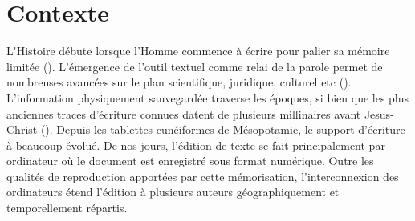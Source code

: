 
\section{Contexte}




\lettrine{L}'Histoire débute lorsque l'Homme commence à écrire pour palier sa
mémoire limitée (\REF). L'émergence de l'outil textuel comme relai de la parole
permet de nombreuses avancées sur le plan scientifique, juridique, culturel etc
(\REF).  L'information physiquement sauvegardée traverse les époques, si bien
que les plus anciennes traces d'écriture connues datent de plusieurs millinaires
avant Jesus-Christ (\REF). Depuis les tablettes cunéiformes de Mésopotamie, le
support d'écriture à beaucoup évolué. De nos jours, l'édition de texte se fait
principalement par ordinateur où le document est enregistré sous format
numérique. Outre les qualités de reproduction apportées par cette mémorisation,
l'interconnexion des ordinateurs étend l'édition à plusieurs auteurs
géographiquement et temporellement répartis.

